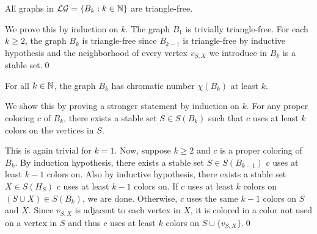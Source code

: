 \begin{thm}
All graphs in $\mathcal{LG}=\lbrace B_k :k\in\mathbb{N}\rbrace$ are triangle-free.
\end{thm}

\begin{prf}
We prove this by induction on $k$. The graph $B_1$ is trivially triangle-free. For each $k\geq 2$, the graph $B_k$ is triangle-free since $B_{k-1}$ is triangle-free by inductive hypothesis and the neighborhood of every vertex $v_{S,X}$ we introduce in $B_k$ is a stable set.\qed
\end{prf}

\begin{thm}\label{t2ls}
For all $k\in\mathbb{N}$, the graph $B_k$ has chromatic number $\chi (B_k)$ at least $k$.
\end{thm}

\begin{prf}
We show this by proving a stronger statement by induction on $k$. For any proper coloring $c$ of $B_k$, there exists a stable set $S\in S(B_k)$ such that $c$ uses at least $k$ colors on the vertices in $S$.

This is again trivial for $k=1$. Now, suppose $k\geq 2$ and $c$ is a proper coloring of $B_k$. By induction hypothesis, there exists a stable set $S\in S(B_{k-1})$ $c$ uses at least $k-1$ colors on. Also by inductive hypothesis, there exists a stable set $X\in S(H_S)$ $c$ uses at least $k-1$ colors on. If $c$ uses at least $k$ colors on $(S\cup X)\in S(B_k)$, we are done. Otherwise, $c$ uses the same $k-1$ colors on $S$ and $X$. Since $v_{S,X}$ is adjacent to each vertex in $X$, it is colored in a color not used on a vertex in $S$ and thus $c$ uses at least $k$ colors on $S\cup\lbrace v_{S,X}\rbrace$.\qed 
\end{prf}

